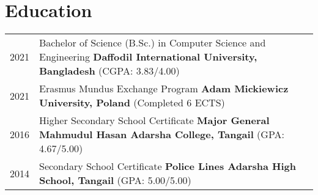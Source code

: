 \section{\textbf{Education}}
\begin{tabularx}{\linewidth}{@{}l X@{}}
    2021 & Bachelor of Science (B.Sc.) in Computer Science
    and Engineering
    \newline
    \textbf{Daffodil International University, Bangladesh} \hfill (CGPA: 3.83/4.00)
    \\

    2021 & Erasmus Mundus Exchange Program
    \newline
    \textbf{Adam Mickiewicz University, Poland} \hfill (Completed 6 ECTS)
    \\

    2016 & Higher Secondary School Certificate
    \newline
    \textbf{Major General Mahmudul Hasan Adarsha College, Tangail} \hfill (GPA:
    4.67/5.00) \\

    2014 & Secondary School Certificate
    \newline
    \textbf{Police Lines Adarsha High School, Tangail} \hfill (GPA: 5.00/5.00)
    \\
\end{tabularx}
